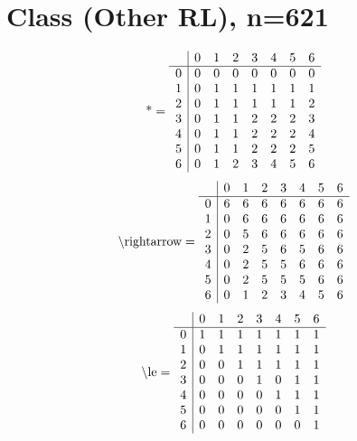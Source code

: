 \documentclass[11pt]{article}
\begin{document}
\section{Class (Other RL), n=621}
\[\text{*} = 
\begin{array}{r | r r r r r r r}
 & 0 & 1 & 2 & 3 & 4 & 5 & 6 \\ \hline
0 & 0 & 0 & 0 & 0 & 0 & 0 & 0 \\
1 & 0 & 1 & 1 & 1 & 1 & 1 & 1 \\
2 & 0 & 1 & 1 & 1 & 1 & 1 & 2 \\
3 & 0 & 1 & 1 & 2 & 2 & 2 & 3 \\
4 & 0 & 1 & 1 & 2 & 2 & 2 & 4 \\
5 & 0 & 1 & 1 & 2 & 2 & 2 & 5 \\
6 & 0 & 1 & 2 & 3 & 4 & 5 & 6 \\
\end{array}
\]
\[\text{\textbackslash rightarrow} = 
\begin{array}{r | r r r r r r r}
 & 0 & 1 & 2 & 3 & 4 & 5 & 6 \\ \hline
0 & 6 & 6 & 6 & 6 & 6 & 6 & 6 \\
1 & 0 & 6 & 6 & 6 & 6 & 6 & 6 \\
2 & 0 & 5 & 6 & 6 & 6 & 6 & 6 \\
3 & 0 & 2 & 5 & 6 & 5 & 6 & 6 \\
4 & 0 & 2 & 5 & 5 & 6 & 6 & 6 \\
5 & 0 & 2 & 5 & 5 & 5 & 6 & 6 \\
6 & 0 & 1 & 2 & 3 & 4 & 5 & 6 \\
\end{array}
\]
\[\text{\textbackslash le} = 
\begin{array}{r | r r r r r r r}
 & 0 & 1 & 2 & 3 & 4 & 5 & 6 \\ \hline
0 & 1 & 1 & 1 & 1 & 1 & 1 & 1 \\
1 & 0 & 1 & 1 & 1 & 1 & 1 & 1 \\
2 & 0 & 0 & 1 & 1 & 1 & 1 & 1 \\
3 & 0 & 0 & 0 & 1 & 0 & 1 & 1 \\
4 & 0 & 0 & 0 & 0 & 1 & 1 & 1 \\
5 & 0 & 0 & 0 & 0 & 0 & 1 & 1 \\
6 & 0 & 0 & 0 & 0 & 0 & 0 & 1 \\
\end{array}
\]
\end{document}

